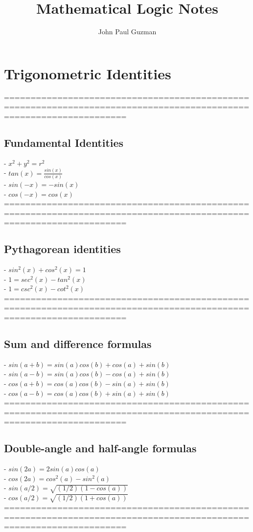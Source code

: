 \documentclass{book}
\title{Mathematical Logic Notes}
\author{John Paul Guzman}
\date{ }
\begin{document}
\maketitle

\chapter{Trigonometric Identities}
	===================================================================================================================
\section{Fundamental Identities}
	- $x^2 + y^2 = r^2$ \\ %
	- $tan(x) = \frac{sin(x)}{cos(x)}$ \\
	- $sin(-x) = -sin(x)$ \\
	- $cos(-x) = cos(x)$ \\
	===================================================================================================================
\section{Pythagorean identities}
	- $sin^2(x) + cos^2(x) = 1$ \\
	- $1 = sec^2(x) - tan^2(x)$ \\
	- $1 = csc^2(x) - cot^2(x)$ \\
	===================================================================================================================
\section{Sum and difference formulas}
	- $sin(a+b) = sin(a) cos(b) + cos(a) + sin(b)$ \\ %
	- $sin(a-b) = sin(a) cos(b) - cos(a) + sin(b)$ \\
	- $cos(a+b) = cos(a) cos(b) - sin(a) + sin(b)$ \\
	- $cos(a-b) = cos(a) cos(b) + sin(a) + sin(b)$ \\
	===================================================================================================================
\section{Double-angle and half-angle formulas}
	- $sin(2a) = 2 sin(a) cos(a)$ \\
	- $cos(2a) = cos^2(a) - sin^2(a)$ \\
	- $sin(a/2) = \sqrt{(1/2) (1 - cos(a))}$ \\
	- $cos(a/2) = \sqrt{(1/2) (1 + cos(a))}$ \\
	===================================================================================================================
\end{document}
